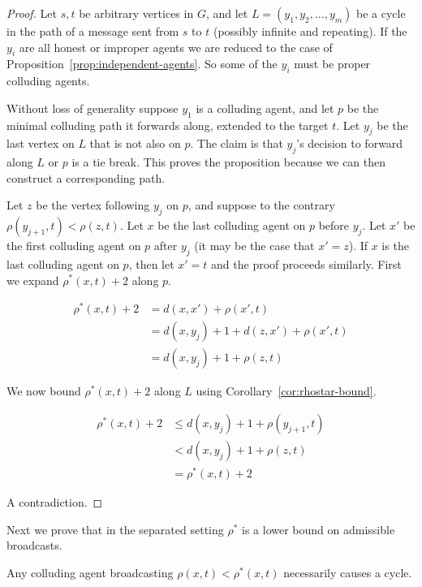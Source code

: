 \documentclass{comnet}
\begin{document}
\begin{proof}

Let $s,t$ be arbitrary vertices in $G$, and let $L = (y_1, y_2, \dots, y_m)$ be
a cycle in the path of a message sent from $s$ to $t$ (possibly infinite and
repeating). If the $y_i$ are all honest or improper agents we are reduced to
the case of Proposition~\ref{prop:independent-agents}. So some of the $y_i$
must be proper colluding agents. 

Without loss of generality suppose $y_1$ is a colluding agent, and let $p$ be
the minimal colluding path it forwards along, extended to the target $t$.  Let
$y_j$ be the last vertex on $L$ that is not also on $p$. The claim is that
$y_j$'s decision to forward along $L$ or $p$ is a tie break. This proves the
proposition because we can then construct a corresponding path. 

Let $z$ be the vertex following $y_j$ on $p$, and suppose to the contrary
$\rho(y_{j+1}, t) < \rho(z,t)$. Let $x$ be the last colluding agent on $p$
before $y_j$. Let $x'$ be the first colluding agent on $p$ after $y_j$ (it may
be the case that $x' = z$). If $x$ is the last colluding agent on $p$, then let
$x'=t$ and the proof proceeds similarly. First we expand $\rho^*(x,t) + 2$
along $p$.

\begin{align*}
   \rho^*(x,t) + 2 &= d(x,x') + \rho(x',t) \\  
                   &= d(x,y_j) + 1 + d(z,x') + \rho(x',t) \\
                   &= d(x,y_j) + 1 + \rho(z,t)
\end{align*}

We now bound $\rho^*(x,t) + 2$ along $L$ using
Corollary~\ref{cor:rhostar-bound}. 

\begin{align*}
   \rho^*(x,t) + 2 &\leq d(x, y_j) + 1 + \rho(y_{j+1}, t) \\  
                   &< d(x, y_j) + 1 + \rho(z,t) \\ 
                   &= \rho^*(x,t) + 2
\end{align*}

A contradiction.
\end{proof}

Next we prove that in the separated setting $\rho^*$ is a lower bound on
admissible broadcasts. 

\begin{proposition} \label{prop:rhostar-lower-bound}

Any colluding agent broadcasting $\rho(x,t) < \rho^*(x,t)$ necessarily causes a
cycle.

\end{proposition}
\end{document}
